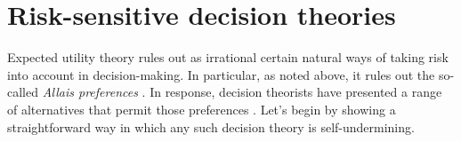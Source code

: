 \documentclass[a4paper,final]{article}
\newenvironment{CCM rewritten}
{\begingroup\color{blue}} %
{\endgroup}              %
\begin{document}



\section{Risk-sensitive decision theories}\label{sect:reu}

Expected utility theory rules out as irrational certain natural ways of taking risk into account in decision-making. In particular, as noted above, it rules out the so-called \emph{Allais preferences} \citep{allais1953c}. In response, decision theorists have presented a range of alternatives that permit those preferences \citep{kahneman1979pt,machina1982eua,quiggin1982tau, buchak2014rr}. Let's begin by showing a straightforward way in which any such decision theory is self-undermining.
\end{document}

